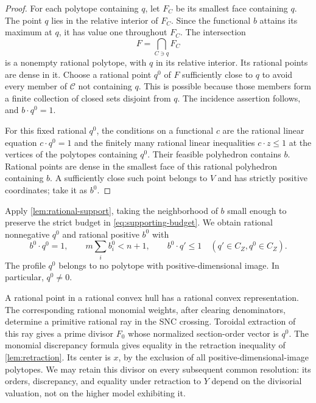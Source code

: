 \begin{proof}
For each polytope containing $q$, let $F_C$ be its smallest face containing $q$.  The point $q$ lies in the relative interior of $F_C$.  Since the functional $b$ attains its maximum at $q$, it has value one throughout $F_C$.  The intersection
\[
 F=\bigcap_{C\ni q}F_C
\]
is a nonempty rational polytope, with $q$ in its relative interior. Its rational points are dense in it.  Choose a rational point $q^0$ of $F$ sufficiently close to $q$ to avoid every member of $\mathcal{C}$ not containing $q$.  This is possible because those members form a finite collection of closed sets disjoint from $q$. The incidence assertion follows, and $b\cdot q^0=1$.

For this fixed rational $q^0$, the conditions on a functional $c$ are the rational linear equation $c\cdot q^0=1$ and the finitely many rational linear inequalities $c\cdot z\leq1$ at the vertices of the polytopes containing $q^0$.  Their feasible polyhedron contains $b$.  Rational points are dense in the smallest face of this rational polyhedron containing $b$.  A sufficiently close such point belongs to $V$ and has strictly positive coordinates; take it as $b^0$.
\end{proof}

Apply \cref{lem:rational-support}, taking the neighborhood of $b$ small enough to preserve the strict budget in \eqref{eq:supporting-budget}.  We obtain rational nonnegative $q^0$ and rational positive $b^0$ with
\begin{equation}
 b^0\cdot q^0=1,
 \qquad m\sum_i b_i^0<n+1,
 \qquad b^0\cdot q'\leq1
 \quad(q'\in C_Z, q^0\in C_Z).
 \label{eq:rational-support-properties}
\end{equation}
The profile $q^0$ belongs to no polytope with positive-dimensional image.  In particular, $q^0\ne0$.

A rational point in a rational convex hull has a rational convex representation.  The corresponding rational monomial weights, after clearing denominators, determine a primitive rational ray in the SNC crossing.  Toroidal extraction of this ray gives a prime divisor $F_0$ whose normalized section-order vector is $q^0$. The monomial discrepancy formula gives equality in the retraction inequality of \cref{lem:retraction}.  Its center is $x$, by the exclusion of all positive-dimensional-image polytopes.  We may retain this divisor on every subsequent common resolution: its orders, discrepancy, and equality under retraction to $Y$ depend on the divisorial valuation, not on the higher model exhibiting it.

